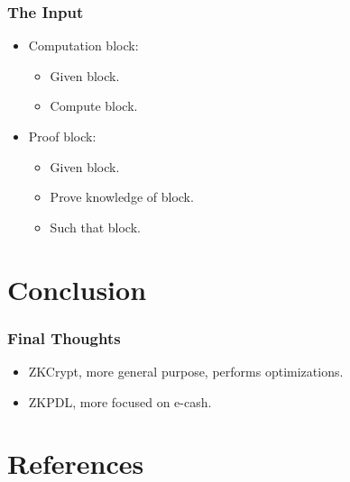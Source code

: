 \documentclass{beamer}
\begin{document}
\begin{frame}
	\frametitle{The Input}
	\begin{itemize}
		\item Computation block:
		\begin{itemize}
			\item Given block.
		
			\item Compute block.
		
		\end{itemize}
	
		\item Proof block:
		\begin{itemize}
			\item Given block.
		
			\item Prove knowledge of block.
		
			\item Such that block.
		\end{itemize}
	\end{itemize}
\end{frame}

\section{Conclusion}

\begin{frame}
	\frametitle{Final Thoughts}
	\begin{itemize}
		\item ZKCrypt, more general purpose, performs optimizations.
		
		\item ZKPDL, more focused on e-cash.
				
	\end{itemize}
\end{frame}

\section*{References}
\end{document}
